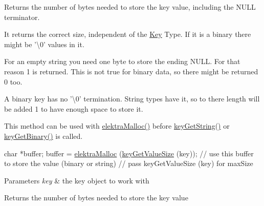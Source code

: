 Returns the number of bytes needed to store the key value, including the N\+U\+L\+L terminator. 

It returns the correct size, independent of the \hyperlink{classkdb_1_1Key}{Key} Type. If it is a binary there might be '\textbackslash{}0' values in it.

For an empty string you need one byte to store the ending N\+U\+L\+L. For that reason 1 is returned. This is not true for binary data, so there might be returned 0 too.

A binary key has no '\textbackslash{}0' termination. String types have it, so to there length will be added 1 to have enough space to store it.

This method can be used with \hyperlink{internal_8c_a35cdc2e5caed3454cb73b4fc7f37858c}{elektra\+Malloc()} before \hyperlink{group__keyvalue_ga41b9fac5ccddafe407fc0ae1e2eb8778}{key\+Get\+String()} or \hyperlink{group__keyvalue_ga4c0d8a4a11174197699c231e0b5c3c84}{key\+Get\+Binary()} is called.


\begin{DoxyCode}
\textcolor{keywordtype}{char} *buffer;
buffer = \hyperlink{internal_8c_a35cdc2e5caed3454cb73b4fc7f37858c}{elektraMalloc} (\hyperlink{group__keyvalue_gae326672fffb7474abfe9baf53b73217e}{keyGetValueSize} (key));
\textcolor{comment}{// use this buffer to store the value (binary or string)}
\textcolor{comment}{// pass keyGetValueSize (key) for maxSize}
\end{DoxyCode}



\begin{DoxyParams}{Parameters}
{\em key} & the key object to work with \\
\hline
\end{DoxyParams}
\begin{DoxyReturn}{Returns}
the number of bytes needed to store the key value 
\end{DoxyReturn}

